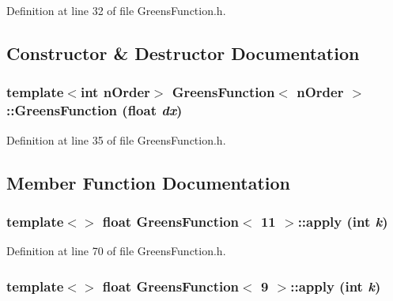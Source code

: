 Definition at line 32 of file GreensFunction.h.



\subsection{Constructor \& Destructor Documentation}
\subsubsection[{GreensFunction}]{\setlength{\rightskip}{0pt plus 5cm}template$<$int nOrder$>$ {\bf GreensFunction}$<$ nOrder $>$::{\bf GreensFunction} (float {\em dx})}\label{classGreensFunction_a8c51bdaf6e812200daa73d4b9b82cc50}


Definition at line 35 of file GreensFunction.h.



\subsection{Member Function Documentation}
\subsubsection[{apply}]{\setlength{\rightskip}{0pt plus 5cm}template$<$$>$ float {\bf GreensFunction}$<$ 11 $>$::apply (int {\em k})}\label{classGreensFunction_a867501f77e3dc2ecdc45daa3b2c12796}


Definition at line 70 of file GreensFunction.h.

\subsubsection[{apply}]{\setlength{\rightskip}{0pt plus 5cm}template$<$$>$ float {\bf GreensFunction}$<$ 9 $>$::apply (int {\em k})}\label{classGreensFunction_af62d4219d35a07357c0ed9f539f946fc}


